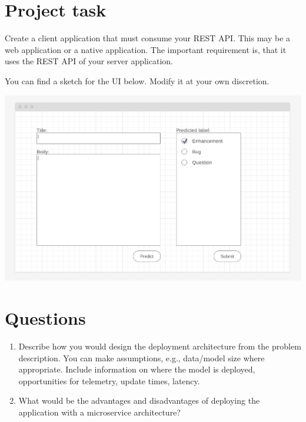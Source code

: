 

\newcommand{\dozenten}{Prof.~Dr.~Steffen Herbold}
\newcommand{\vorlesung}{Principles of AI Engineering}
\newcommand{\docauthor}{Lukas Schulte}
\newcommand{\semester}{}
\newcommand{\blattnummer}{7}
\newcommand{\bistermin}{}



\section*{Project task}

Create a client application that must consume your REST API. This may be a web application or a native application. The important requirement is, that it uses the REST API of your server application.

\vspace{5px}

You can find a sketch for the UI below. Modify it at your own discretion.

\vspace{5px}

\includegraphics[width=\linewidth]{upPrinciplesAIEWireframe.png}

\section*{Questions}

\begin{enumerate}
      \item
            Describe how you would design the deployment architecture from the problem description. You can make assumptions, e.g., data/model size where appropriate.
            Include information on where the model is deployed, opportunities for telemetry, update times, latency.
      \item
            What would be the advantages and disadvantages of deploying the application with a microservice architecture?
\end{enumerate}


